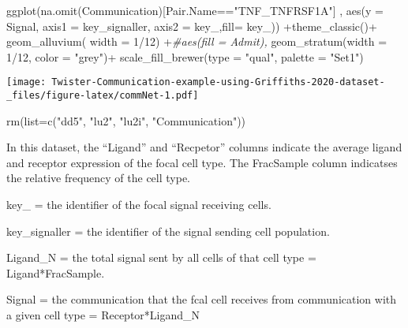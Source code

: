 \documentclass[
]{article}
\newenvironment{Shaded}{\begin{snugshade}}{\end{snugshade}}
\newcommand{\AttributeTok}[1]{\textcolor[rgb]{0.77,0.63,0.00}{#1}}
\newcommand{\CommentTok}[1]{\textcolor[rgb]{0.56,0.35,0.01}{\textit{#1}}}
\newcommand{\DecValTok}[1]{\textcolor[rgb]{0.00,0.00,0.81}{#1}}
\newcommand{\FunctionTok}[1]{\textcolor[rgb]{0.00,0.00,0.00}{#1}}
\newcommand{\NormalTok}[1]{#1}
\newcommand{\SpecialCharTok}[1]{\textcolor[rgb]{0.00,0.00,0.00}{#1}}
\newcommand{\StringTok}[1]{\textcolor[rgb]{0.31,0.60,0.02}{#1}}
\begin{document}
\begin{Shaded}
\begin{Highlighting}[]
 \FunctionTok{ggplot}\NormalTok{(}\FunctionTok{na.omit}\NormalTok{(Communication)[Pair.Name}\SpecialCharTok{==}\StringTok{"TNF\_TNFRSF1A"}\NormalTok{] ,}
        \FunctionTok{aes}\NormalTok{(}\AttributeTok{y =}\NormalTok{ Signal, }\AttributeTok{axis1 =}\NormalTok{ key\_signaller, }\AttributeTok{axis2 =}\NormalTok{ key\_,}\AttributeTok{fill=}\NormalTok{ key\_)) }\SpecialCharTok{+}\FunctionTok{theme\_classic}\NormalTok{()}\SpecialCharTok{+}
   \FunctionTok{geom\_alluvium}\NormalTok{( }\AttributeTok{width =} \DecValTok{1}\SpecialCharTok{/}\DecValTok{12}\NormalTok{) }\SpecialCharTok{+}\CommentTok{\#aes(fill = Admit),}
   \FunctionTok{geom\_stratum}\NormalTok{(}\AttributeTok{width =} \DecValTok{1}\SpecialCharTok{/}\DecValTok{12}\NormalTok{,  }\AttributeTok{color =} \StringTok{"grey"}\NormalTok{)}\SpecialCharTok{+}
   \FunctionTok{scale\_fill\_brewer}\NormalTok{(}\AttributeTok{type =} \StringTok{"qual"}\NormalTok{, }\AttributeTok{palette =} \StringTok{"Set1"}\NormalTok{)}
\end{Highlighting}
\end{Shaded}

\texttt{[image: Twister-Communication-example-using-Griffiths-2020-dataset-\_files/figure-latex/commNet-1.pdf]}

\begin{Shaded}
\begin{Highlighting}[]
\FunctionTok{rm}\NormalTok{(}\AttributeTok{list=}\FunctionTok{c}\NormalTok{(}\StringTok{"dd5"}\NormalTok{, }\StringTok{"lu2"}\NormalTok{, }\StringTok{"lu2i"}\NormalTok{, }\StringTok{"Communication"}\NormalTok{))}
\end{Highlighting}
\end{Shaded}

In this dataset, the ``Ligand'' and ``Recpetor'' columns indicate the
average ligand and receptor expression of the focal cell type. The
FracSample column indicatses the relative frequency of the cell type.

key\_ = the identifier of the focal signal receiving cells.

key\_signaller = the identifier of the signal sending cell population.

Ligand\_N = the total signal sent by all cells of that cell type =
Ligand*FracSample.

Signal = the communication that the fcal cell receives from
communication with a given cell type = Receptor*Ligand\_N
\end{document}
